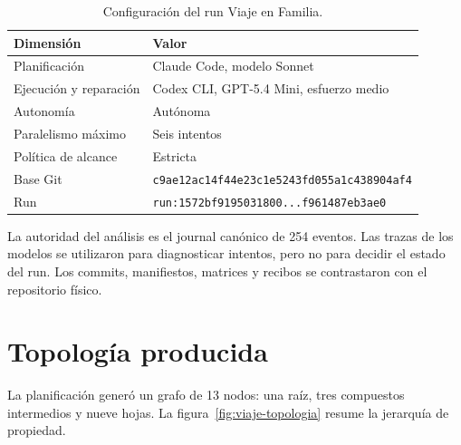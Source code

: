 \begin{table}[htbp]
  \centering
  \caption{Configuración del run Viaje en Familia.}
  \label{tab:viaje-config}
  \small
  \begin{tabularx}{\textwidth}{@{}l X@{}}
    \toprule
    \textbf{Dimensión} & \textbf{Valor} \\
    \midrule
    Planificación & Claude Code, modelo Sonnet \\
    Ejecución y reparación & Codex CLI, GPT-5.4 Mini, esfuerzo medio \\
    Autonomía & Autónoma \\
    Paralelismo máximo & Seis intentos \\
    Política de alcance & Estricta \\
    Base Git & \texttt{c9ae12ac14f44e23c1e5243fd055a1c438904af4} \\
    Run & \texttt{run:1572bf9195031800...f961487eb3ae0} \\
    \bottomrule
  \end{tabularx}
\end{table}

La autoridad del análisis es el journal canónico de 254 eventos. Las trazas de
los modelos se utilizaron para diagnosticar intentos, pero no para decidir el
estado del run. Los commits, manifiestos, matrices y recibos se contrastaron con
el repositorio físico.

\section{Topología producida}

La planificación generó un grafo de 13 nodos: una raíz, tres compuestos
intermedios y nueve hojas. La figura~\ref{fig:viaje-topologia} resume la
jerarquía de propiedad.


